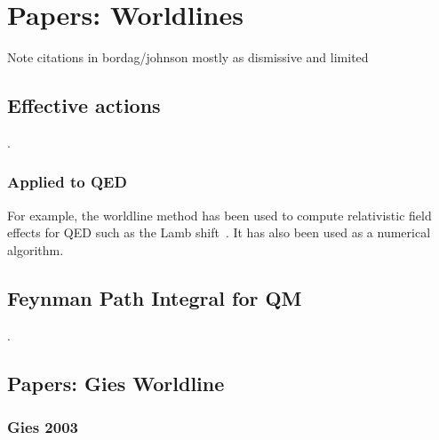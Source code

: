 \section{Papers: Worldlines}

Note citations in bordag/johnson mostly as dismissive and limited  

\subsection{Effective actions}

\cite{McKeon1993, Strassler1992,Schubert2001}



\cite{Schubert2001}.  

\subsubsection{Applied to QED}

For example, the worldline method has been used to compute relativistic field effects for QED such as the Lamb shift~\cite{Schmidt1995}.  It has also been used as a numerical algorithm\cite{Mazur2014}.

\subsection{Feynman Path Integral for QM}

\cite{Feynman1948,Feynman1965,Brown2005}.

\subsection{Papers: Gies Worldline}

\subsubsection{Gies 2003}
\cite{Gies2003}

